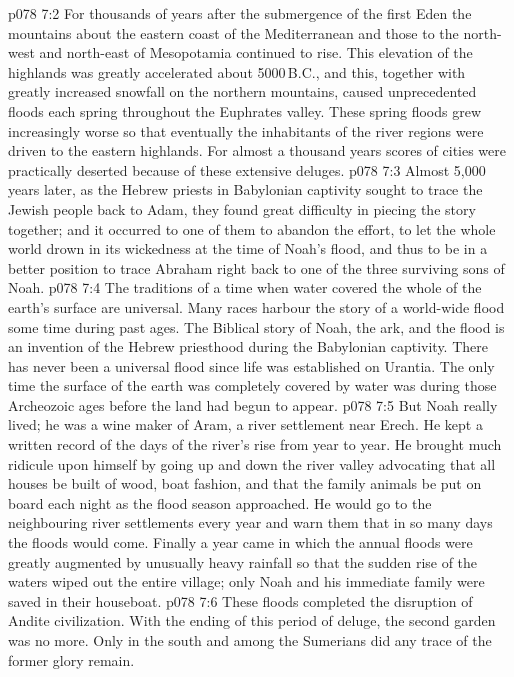 \vs p078 7:2 For thousands of years after the submergence of the first Eden the mountains about the eastern coast of the Mediterranean and those to the north\hyp{}west and north\hyp{}east of Mesopotamia continued to rise. This elevation of the highlands was greatly accelerated about 5000\,B.C., and this, together with greatly increased snowfall on the northern mountains, caused unprecedented floods each spring throughout the Euphrates valley. These spring floods grew increasingly worse so that eventually the inhabitants of the river regions were driven to the eastern highlands. For almost a thousand years scores of cities were practically deserted because of these extensive deluges.
\vs p078 7:3 \pc Almost 5,000 years later, as the Hebrew priests in Babylonian captivity sought to trace the Jewish people back to Adam, they found great difficulty in piecing the story together; and it occurred to one of them to abandon the effort, to let the whole world drown in its wickedness at the time of Noah’s flood, and thus to be in a better position to trace Abraham right back to one of the three surviving sons of Noah.
\vs p078 7:4 The traditions of a time when water covered the whole of the earth’s surface are universal. Many races harbour the story of a world\hyp{}wide flood some time during past ages. The Biblical story of Noah, the ark, and the flood is an invention of the Hebrew priesthood during the Babylonian captivity. There has never been a universal flood since life was established on Urantia. The only time the surface of the earth was completely covered by water was during those Archeozoic ages before the land had begun to appear.
\vs p078 7:5 But Noah really lived; he was a wine maker of Aram, a river settlement near Erech. He kept a written record of the days of the river’s rise from year to year. He brought much ridicule upon himself by going up and down the river valley advocating that all houses be built of wood, boat fashion, and that the family animals be put on board each night as the flood season approached. He would go to the neighbouring river settlements every year and warn them that in so many days the floods would come. Finally a year came in which the annual floods were greatly augmented by unusually heavy rainfall so that the sudden rise of the waters wiped out the entire village; only Noah and his immediate family were saved in their houseboat.
\vs p078 7:6 \pc These floods completed the disruption of Andite civilization. With the ending of this period of deluge, the second garden was no more. Only in the south and among the Sumerians did any trace of the former glory remain.
